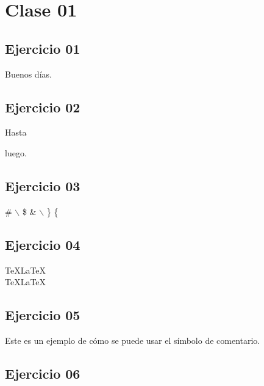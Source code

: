 \documentclass[10pt,a4paper]{article}
\author{Jhabriel Varela}
\begin{document}
\section{Clase 01}

\subsection{Ejercicio 01}

Buenos          días.

\subsection{Ejercicio 02}

Hasta









luego.

\subsection{Ejercicio 03}	

\# $\backslash$ \$  \& $\backslash$ \} \{

\subsection{Ejercicio 04}

\TeX \LaTeX \\
\TeX\LaTeX \\

\subsection{Ejercicio 05}

Este es un %
                                  ejemplo de cómo se puede usar el %
           símbolo de comentario.

\subsection{Ejercicio 06}
\end{document}
